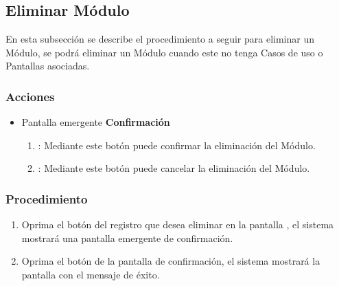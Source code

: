 \subsection{Eliminar Módulo}

En esta subsección se describe el procedimiento a seguir para eliminar un Módulo, se podrá eliminar un Módulo cuando este no tenga Casos de uso o Pantallas asociadas.


\subsubsection{Acciones}
\begin{itemize}
  \item Pantalla emergente \textbf{Confirmación}
  \begin{enumerate}
	\item {}: Mediante este botón puede confirmar la eliminación del Módulo.
	\item {}: Mediante este botón puede cancelar la eliminación del Módulo.
  \end{enumerate}
\end{itemize}


\subsubsection{Procedimiento}
\begin{enumerate}
	\item Oprima el botón \btnEliminar del registro que desea eliminar en la pantalla , el sistema mostrará una pantalla emergente de confirmación.
	
	\item Oprima el botón  de la pantalla de confirmación, el sistema mostrará la pantalla  con el mensaje de éxito.
\end{enumerate}

